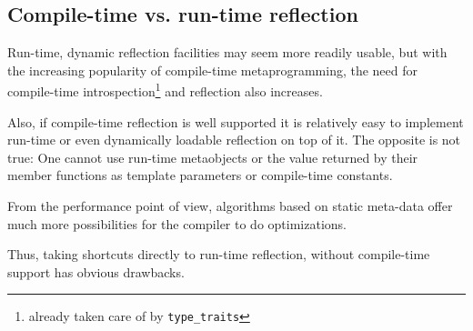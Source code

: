 \subsection{Compile-time vs. run-time reflection}

Run-time, dynamic reflection facilities may seem more readily
usable, but with the increasing popularity of compile-time metaprogramming,
the need for compile-time introspection\footnote{already taken care of
by \texttt{type\_traits}} and reflection also increases.

Also, if compile-time reflection is well supported it is relatively
easy to implement run-time or even dynamically loadable reflection
on top of it. The opposite is not true: One cannot use run-time metaobjects
or the value returned by their member functions as template parameters
or compile-time constants.

From the performance point of view, algorithms based on static
meta-data offer much more possibilities for the compiler to do
optimizations.

Thus, taking shortcuts directly to run-time reflection, without
compile-time support has obvious drawbacks.

